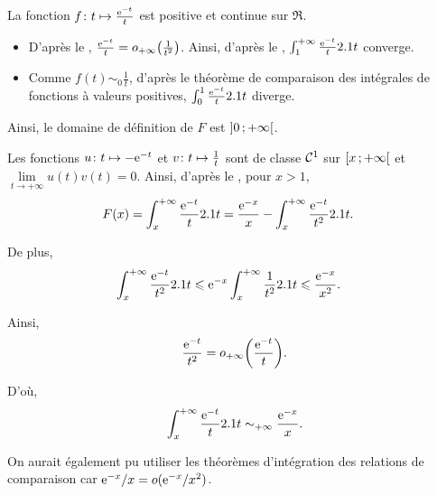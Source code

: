 \begin{elemsolution}
\begin{reponses}
\item La fonction $\fonctionligne[f]{t}{\frac{\e^{-t}}{t}}$ est positive et continue sur $\Re$.

\begin{itemize}
\item D'après le , $\frac{\e^{-t}}{t} = o_{+\infty}\mathopen{}\left(\frac{1}{t^2}\right)$. Ainsi, d'après le , $\int_1^{+\infty} \frac{\e^{-t}}{t} \d t$ converge.

\item Comme $f(t) \sim_0 \frac{1}{t}$, d'après le théorème de comparaison des intégrales de fonctions à valeurs positives, $\int_0^1 \frac{\e^{-t}}{t} \d t$ diverge.
\end{itemize}

Ainsi, le domaine de définition de $F$ est $\interoo{0}{+ \infty}$.

\item Les fonctions $\fonctionligne[u]{t}{-\e^{-t}}$ et $\fonctionligne[v]{t}{\frac{1}{t}}$ sont de classe $\Cont^1$ sur $\interfo{x}{+\infty}$ et $\lim\limits_{t\to+\infty} u(t) v(t) = 0$. Ainsi, d'après le , pour $x > 1$, 
\begin{align*}
F(x)
&= \int_x^{+ \infty} \frac{\e^{-t}}{t} \d t 
= \frac{\e^{-x}}{x} - \int_x^{+\infty} \frac{\e^{-t}}{t^2} \d t.
\end{align*}

De plus,
\begin{align*}
\int_x^{+\infty} \frac{\e^{-t}}{t^2} \d t
&\leqslant \e^{-x} \int_x^{+\infty} \frac{1}{t^2} \d t
\leqslant \frac{\e^{-x}}{x^2}.
\end{align*}

Ainsi,
$$\frac{\e^{-t}}{t^2} = o_{+\infty}\mathopen{}\bigg( \frac{\e^{-t}}{t} \bigg).$$

D'où,
\[
\int_x^{+\infty} \frac{\e^{-t}}{t} \d t \sim_{+\infty} \frac{\e^{-x}}{x}.
\]

\begin{remarque}
On aurait également pu utiliser les théorèmes d'intégration des relations de comparaison car $\e^{-x}/x = o(\e^{-x}/x^2)$.
\end{remarque}


\end{reponses}
\end{elemsolution}
